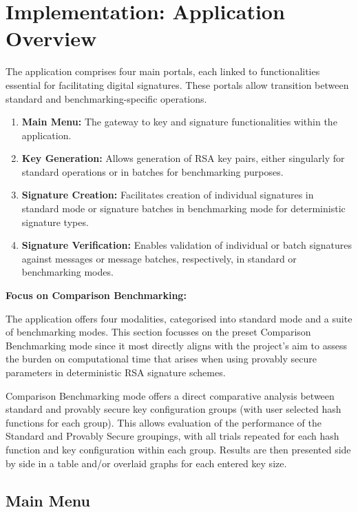 \documentclass[]{final_report}
\theoremstyle{definition}
\begin{document}
\section{Implementation: Application Overview}
The application comprises four main portals, each linked to functionalities essential for facilitating digital signatures. These portals allow transition between standard and benchmarking-specific operations.
\begin{enumerate}
    \item \textbf{Main Menu:} The gateway to key and signature functionalities within the application.
    \item \textbf{Key Generation:} Allows generation of RSA key pairs, either singularly for standard operations or in batches for benchmarking purposes.
    \item \textbf{Signature Creation:} Facilitates creation of individual signatures in standard mode or signature batches in benchmarking mode for deterministic signature types.
    \item \textbf{Signature Verification:} Enables validation of individual or batch signatures against messages or message batches, respectively, in standard or benchmarking modes.
\end{enumerate}


\textbf{Focus on Comparison Benchmarking:}

The application offers four modalities, categorised into standard mode and a suite of benchmarking modes. This section focusses on the preset Comparison Benchmarking mode since it most directly aligns with the project's aim to assess the burden on computational time that arises when using provably secure parameters in deterministic RSA signature schemes. 


Comparison Benchmarking mode offers a direct comparative analysis between standard and provably secure key configuration groups (with user selected hash functions for each group). This allows evaluation of the performance of the Standard and Provably Secure groupings, with all trials repeated for each hash function and key configuration within each group. Results are then presented side by side in a table and/or overlaid graphs for each entered key size.

\subsection{Main Menu}
\end{document}
